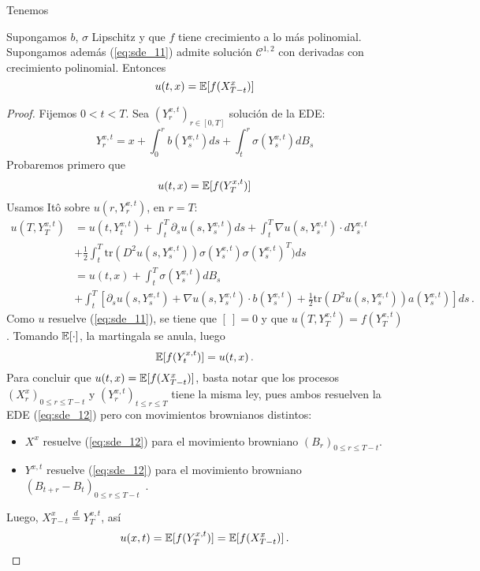 Tenemos 
\begin{theorem}
    Supongamos $b$, $\sigma$ Lipschitz y que $f$ tiene crecimiento a lo más polinomial. Supongamos además (\ref{eq:sde_11}) admite solución $\mathcal{C}^{1,2}$ con derivadas con crecimiento polinomial. Entonces 
    \begin{equation*}
        u(t,x) = \mathbb{E}[ f (X_{T-t}^{x})]
    \end{equation*}
\end{theorem}
 \begin{proof}
\gris
Fijemos $0 < t < T$. Sea $(Y_{r}^{x,t})_{r \in [0,T]}$ solución de la EDE: 
\begin{equation*}
     Y_{r}^{x,t} = x + \int_{0}^{r} b(Y_{s}^{x,t})ds + \int_{t}^{r} \sigma (Y_{s}^{x,t}) dB_s
\end{equation*}
Probaremos primero que
\begin{equation*}
    u(t,x) = \mathbb{E} [f (Y_T^{x,t})]
\end{equation*}
Usamos It\^{o} sobre $u(r,Y_r^{x,t})$, en $r = T$:
\begin{align*}
     u(T, Y_T^{x,t}) & =  u(t,Y_t^{x,t}) + \int_{t}^{T} \partial_s u(s,Y_s^{x,t}) ds + \int_{t}^{T} \nabla u (s, Y_s^{x,t}) \cdot dY_s^{x,t} \\
      & + \frac{1}{2} \int_{t}^{T} \text{tr} (D^2 u(s,Y_s^{x,t})) \sigma(Y_s^{x,t})\sigma(Y_s^{x,t})^{T}) ds \\ 
     & = u(t,x) + \int_{t}^{T} \sigma(Y_s^{x,t}) dB_s \\
     & + \int_{t}^{T} \left[\partial_s u (s, Y_s^{x,t}) + \nabla u(s,Y_s^{x,t}) \cdot  b(Y_s^{x,t}) + \frac{1}{2} \text{tr}(D^2 u (s, Y_s^{x,t}))a(Y_s^{x,t})\right] ds \,.
\end{align*}
Como $u$ resuelve (\ref{eq:sde_11}), se tiene que $[ ~ ] = 0$ y que $u(T,Y_{T}^{x,t}) = f(Y_T^{x,t})$. Tomando $\mathbb{E}[\cdot]$, la martingala se anula, luego 
\begin{equation*}
     \mathbb{E} [f(Y_{t}^{x,t})] = u(t,x) \,.
\end{equation*}
Para concluir que $u(t,x) = \mathbb{E} [f(X_{T-t}^{x})]$, basta notar que los procesos $(X_r^{x})_{0 \le r \le T-t}$ y $(Y_r^{x,t})_{t \le  r \le T}$ tiene la misma ley, pues ambos resuelven la EDE (\ref{eq:sde_12}) pero con movimientos brownianos distintos: 
\begin{itemize}
    \item $X^x$ resuelve (\ref{eq:sde_12}) para el movimiento browniano $(B_{r})_{0 \le r \le T - t}$. 
    \item $Y^{x,t}$ resuelve (\ref{eq:sde_12}) para el movimiento browniano $(B_{t+r} - B_t)_{0 \le  r \le  T-t}$ \,.
\end{itemize}
Luego, $X_{T-t}^{x} \stackrel{d}{=} Y_{T}^{x,t}$,  así
\begin{equation*}
    u(x,t) = \mathbb{E} [f(Y_{T}^{x,t})] = \mathbb{E} [f(X_{T-t}^{x})] \,.
\end{equation*}
\findem
\negro
\end{proof}

